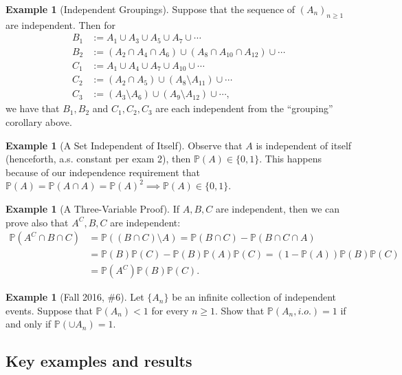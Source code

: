 \documentclass[12pt,reqno]{article}
\theoremstyle{plain}
\theoremstyle{definition}
\newtheorem{example}[theorem]{Example}
\newcommand{\PP}[1]{\ensuremath{\mathbb{P}\left(#1\right)}}
\begin{document}
\begin{example}[Independent Groupings] 
Suppose that the sequence of $(A_n)_{n \geq 1}$ are independent. Then for 
\begin{align*} 
B_1 & := A_1 \cup A_3 \cup A_5 \cup A_7 \cup \cdots \\ 
B_2 & := (A_2 \cap A_4 \cap A_6) \cup (A_8 \cap A_{10} \cap A_{12}) \cup \cdots \\ 
C_1 & := A_1 \cup A_4 \cup A_7 \cup A_{10} \cup \cdots \\ 
C_2 & := (A_2 \cap A_5) \cup (A_8 \setminus A_{11}) \cup \cdots \\ 
C_3 & := (A_3 \setminus A_6) \cup (A_9 \setminus A_{12}) \cup \cdots , 
\end{align*} 
we have that $B_1,B_2$ and $C_1,C_2,C_3$ are each independent from the ``grouping'' 
corollary above. 
\end{example} 

\begin{example}[A Set Independent of Itself] 
Observe that $A$ is independent of itself (henceforth, a.s. constant per exam 2), then 
$\PP{A} \in \{0,1\}$. This happens because of our independence requirement that 
$\PP{A} = \PP{A \cap A} = \PP{A}^2 \implies \PP{A} \in \{0,1\}$. 
\end{example} 

\begin{example}[A Three-Variable Proof] 
If $A,B,C$ are independent, then we can prove also that $A^C,B,C$ are independent: 
\begin{align*} 
\PP{A^C \cap B \cap C} & = \PP{(B \cap C) \setminus A} = \PP{B \cap C} - \PP{B \cap C \cap A} \\ 
     & = \PP{B} \PP{C} - \PP{B} \PP{A} \PP{C} = (1-\PP{A}) \PP{B} \PP{C} \\ 
     & = \PP{A^C} \PP{B} \PP{C}. 
\end{align*} 
\end{example} 

\begin{example}[Fall 2016, \#6]
Let $\{A_n\}$ be an infinite collection of independent events. 
Suppose that $\PP{A_n} < 1$ for every $n \geq 1$. Show that 
$\PP{A_n, i.o.} = 1$ if and only if $\PP{\cup A_n} = 1$. 
\end{example} 

\subsection{Key examples and results} 
\end{document}
